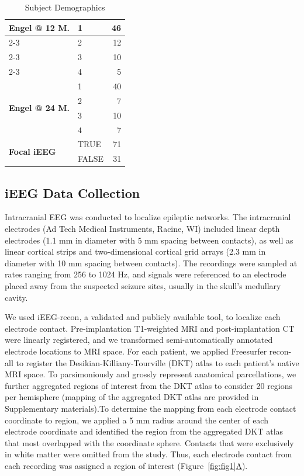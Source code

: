 \documentclass[11pt]{article}
\begin{document}
\begin{table}[h!]
\begin{tabular}{l|l|r}
\hline
\multirow{4}{*}{\textbf{Engel @ 12 M.}} 
    & 1 & 46 \\ \cline{2-3}
    & 2 & 12 \\ \cline{2-3}
    & 3 & 10 \\ \cline{2-3}
    & 4 & 5  \\ 
\hline
\multirow{4}{*}{\textbf{Engel @ 24 M.}}
    & 1 & 40 \\ \cline{2-3}
    & 2 & 7  \\ \cline{2-3}
    & 3 & 10 \\ \cline{2-3}
    & 4 & 7  \\ 
\hline
\multirow{2}{*}{\textbf{Focal iEEG}} 
    & TRUE  & 71 \\ \cline{2-3}
    & FALSE & 31 \\ 

\end{tabular}
\caption{Subject Demographics}
\label{tab:tab 1}
\end{table}



\subsection*{iEEG Data Collection}
Intracranial EEG was conducted to localize epileptic networks. The intracranial electrodes (Ad Tech Medical Instruments, Racine, WI) included linear depth electrodes (1.1 mm in diameter with 5 mm spacing between contacts), as well as linear cortical strips and two-dimensional cortical grid arrays (2.3 mm in diameter with 10 mm spacing between contacts). The recordings were sampled at rates ranging from 256 to 1024 Hz, and signals were referenced to an electrode placed away from the suspected seizure sites, usually in the skull's medullary cavity.

We used iEEG-recon, a validated and publicly available tool, to localize each electrode contact\cite{lucas_span_2024}. Pre-implantation T1-weighted MRI and post-implantation CT were linearly registered, and we transformed semi-automatically annotated electrode locations to MRI space. For each patient, we applied Freesurfer recon-all to register the Desikian-Killiany-Tourville (DKT) atlas to each patient’s native MRI space\cite{Klein2012101}. To parsimoniously and grossly represent anatomical parcellations, we further aggregated regions of interest from the DKT atlas to consider 20 regions per hemisphere (mapping of the aggregated DKT atlas are provided in Supplementary materials)\cite{Gallagher2023Quantifying,Bernabei2022Normative}.To determine the mapping from each electrode contact coordinate to region, we applied a 5 mm radius around the center of each electrode coordinate and identified the region from the aggregated DKT atlas that most overlapped with the coordinate sphere. Contacts that were exclusively in white matter were omitted from the study. Thus, each electrode contact from each recording was assigned a region of interest (Figure~\hyperref[fig:fig1]{\ref*{fig:fig1}A}).
\end{document}

